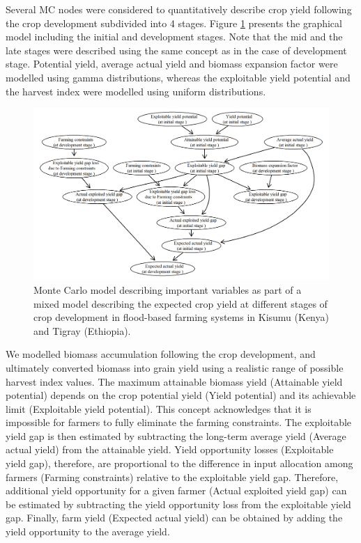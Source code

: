 \documentclass[]{elsarticle} %
\begin{document}
Several MC nodes were considered to quantitatively describe crop yield following the crop development subdivided into 4 stages. Figure \ref{fig:fig9} presents the graphical model including the initial and development stages. Note that the mid and the late stages were described using the same concept as in the case of development stage. Potential yield, average actual yield and biomass expansion factor were modelled using gamma distributions, whereas the exploitable yield potential and the harvest index were modelled using uniform distributions.

\begin{figure}[!h]

{\centering \includegraphics[width=1\linewidth,]{figures/Modelling_FBFS_Monte_carlo_model} 

}

\caption{Monte Carlo model describing important variables as part of a mixed model describing the expected crop yield at different stages of crop development in flood-based farming systems in Kisumu (Kenya) and Tigray (Ethiopia).}\label{fig:fig9}
\end{figure}

We modelled biomass accumulation following the crop development, and ultimately converted biomass into grain yield using a realistic range of possible harvest index values. The maximum attainable biomass yield (Attainable yield potential) depends on the crop potential yield (Yield potential) and its achievable limit (Exploitable yield potential). This concept acknowledges that it is impossible for farmers to fully eliminate the farming constraints. The exploitable yield gap is then estimated by subtracting the long-term average yield (Average actual yield) from the attainable yield. Yield opportunity losses (Exploitable yield gap), therefore, are proportional to the difference in input allocation among farmers (Farming constraints) relative to the exploitable yield gap. Therefore, additional yield opportunity for a given farmer (Actual exploited yield gap) can be estimated by subtracting the yield opportunity loss from the exploitable yield gap. Finally, farm yield (Expected actual yield) can be obtained by adding the yield opportunity to the average yield.
\end{document}
